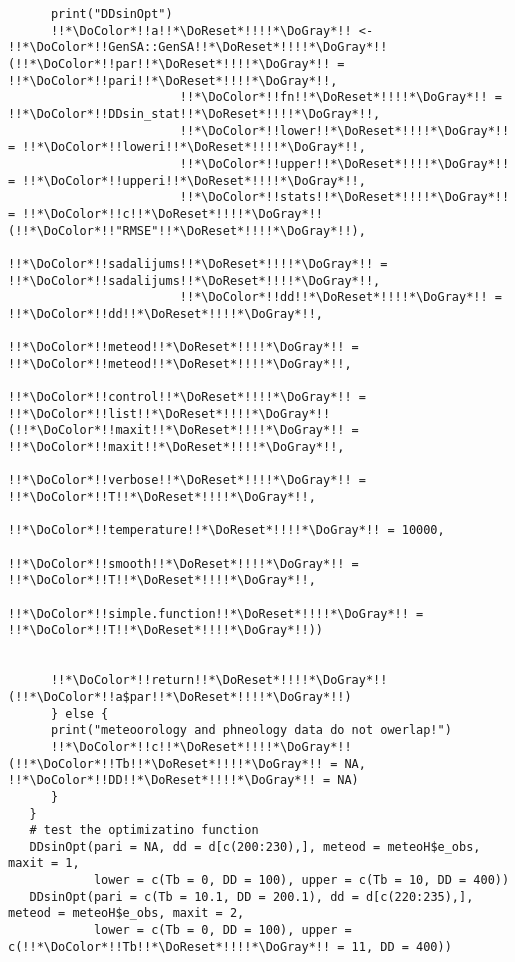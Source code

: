 \begin{verbatim}
      print("DDsinOpt")
      !!*\DoColor*!!a!!*\DoReset*!!!!*\DoGray*!! <- !!*\DoColor*!!GenSA::GenSA!!*\DoReset*!!!!*\DoGray*!!(!!*\DoColor*!!par!!*\DoReset*!!!!*\DoGray*!! = !!*\DoColor*!!pari!!*\DoReset*!!!!*\DoGray*!!,
                        !!*\DoColor*!!fn!!*\DoReset*!!!!*\DoGray*!! = !!*\DoColor*!!DDsin_stat!!*\DoReset*!!!!*\DoGray*!!,
                        !!*\DoColor*!!lower!!*\DoReset*!!!!*\DoGray*!! = !!*\DoColor*!!loweri!!*\DoReset*!!!!*\DoGray*!!,
                        !!*\DoColor*!!upper!!*\DoReset*!!!!*\DoGray*!! = !!*\DoColor*!!upperi!!*\DoReset*!!!!*\DoGray*!!,
                        !!*\DoColor*!!stats!!*\DoReset*!!!!*\DoGray*!! = !!*\DoColor*!!c!!*\DoReset*!!!!*\DoGray*!!(!!*\DoColor*!!"RMSE"!!*\DoReset*!!!!*\DoGray*!!),
                        !!*\DoColor*!!sadalijums!!*\DoReset*!!!!*\DoGray*!! = !!*\DoColor*!!sadalijums!!*\DoReset*!!!!*\DoGray*!!,
                        !!*\DoColor*!!dd!!*\DoReset*!!!!*\DoGray*!! = !!*\DoColor*!!dd!!*\DoReset*!!!!*\DoGray*!!,
                        !!*\DoColor*!!meteod!!*\DoReset*!!!!*\DoGray*!! = !!*\DoColor*!!meteod!!*\DoReset*!!!!*\DoGray*!!,
                        !!*\DoColor*!!control!!*\DoReset*!!!!*\DoGray*!! = !!*\DoColor*!!list!!*\DoReset*!!!!*\DoGray*!!(!!*\DoColor*!!maxit!!*\DoReset*!!!!*\DoGray*!! = !!*\DoColor*!!maxit!!*\DoReset*!!!!*\DoGray*!!,
                                       !!*\DoColor*!!verbose!!*\DoReset*!!!!*\DoGray*!! = !!*\DoColor*!!T!!*\DoReset*!!!!*\DoGray*!!,
                                       !!*\DoColor*!!temperature!!*\DoReset*!!!!*\DoGray*!! = 10000,
                                       !!*\DoColor*!!smooth!!*\DoReset*!!!!*\DoGray*!! = !!*\DoColor*!!T!!*\DoReset*!!!!*\DoGray*!!,
                                       !!*\DoColor*!!simple.function!!*\DoReset*!!!!*\DoGray*!! = !!*\DoColor*!!T!!*\DoReset*!!!!*\DoGray*!!))


      !!*\DoColor*!!return!!*\DoReset*!!!!*\DoGray*!!(!!*\DoColor*!!a$par!!*\DoReset*!!!!*\DoGray*!!)
      } else {
      print("meteoorology and phneology data do not owerlap!")
      !!*\DoColor*!!c!!*\DoReset*!!!!*\DoGray*!!(!!*\DoColor*!!Tb!!*\DoReset*!!!!*\DoGray*!! = NA, !!*\DoColor*!!DD!!*\DoReset*!!!!*\DoGray*!! = NA)
      }
   }
   # test the optimizatino function
   DDsinOpt(pari = NA, dd = d[c(200:230),], meteod = meteoH$e_obs, maxit = 1,
            lower = c(Tb = 0, DD = 100), upper = c(Tb = 10, DD = 400))
   DDsinOpt(pari = c(Tb = 10.1, DD = 200.1), dd = d[c(220:235),], meteod = meteoH$e_obs, maxit = 2,
            lower = c(Tb = 0, DD = 100), upper = c(!!*\DoColor*!!Tb!!*\DoReset*!!!!*\DoGray*!! = 11, DD = 400))


\end{verbatim}
